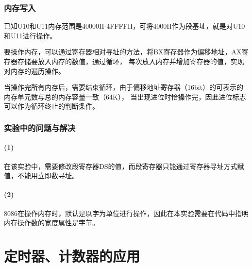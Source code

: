 \documentclass[12pt, a4paper, oneside]{ctexart}
\begin{document}
    \subsubsection{内存写入}
    已知U10和U11内存范围是40000H-4FFFFH，可将4000H作为段基址，就是对U10和U11进行操作。

    要操作内存，可以通过寄存器相对寻址的方法，将BX寄存器作为偏移地址，AX寄存器存储要放入内存的数值，通过循环，
    每次放入内存并增加寄存器的值，实现对内存的遍历操作。

    当操作完所有内存后，需要结束循环，由于偏移地址寄存器（16bit）的可表示的内存单元数与总的内存容量一致（64K），
    当出现进位时恰操作完，因此进位标志可以作为循环终止的判断条件。

    \subsubsection{实验中的问题与解决}
    \paragraph{(1)} 在该实验中，需要修改段寄存器DS的值，而段寄存器只能通过寄存器寻址方式赋值，不能用立即数寻址。
    \paragraph{(2)} 8086在操作内存时，默认是以字为单位进行操作，因此在本实验需要在代码中指明内存操作数的宽度属性是字节。
    \section{定时器、计数器的应用}

    
\end{document}
